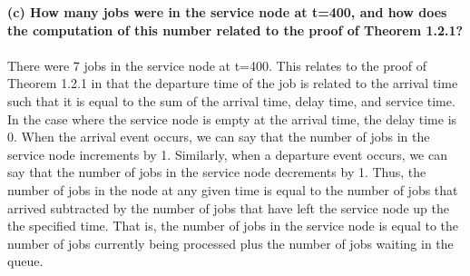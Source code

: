 \textbf{(c) How many jobs were in the service node at t=400, and how does the computation of this number related to the proof of Theorem 1.2.1?\\\\}
There were 7 jobs in the service node at t=400. This relates to the proof of Theorem 1.2.1 in that the departure time of the job is related to the arrival time such that it is equal to the sum of the arrival time, delay time, and service time. In the case where the service node is empty at the arrival time, the delay time is 0. When the arrival event occurs, we can say that the number of jobs in the service node increments by 1. Similarly, when a departure event occurs, we can say that the number of jobs in the service node decrements by 1. Thus, the number of jobs in the node at any given time is equal to the number of jobs that arrived subtracted by the number of jobs that have left the service node up the the specified time. That is, the number of jobs in the service node is equal to the number of jobs currently being processed plus the number of jobs waiting in the queue.\\\\ 